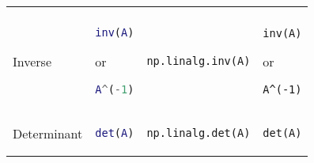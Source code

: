 \documentclass[10pt, landscape]{article}
\begin{document}
\begin{multicols}{2}
\begin{tabular}[]{@{}llll@{}}
\begin{minipage}[t]{0.20\columnwidth}
\end{minipage}\tabularnewline
\begin{minipage}[t]{0.23\columnwidth}\raggedright
Inverse
\end{minipage} & \begin{minipage}[t]{0.22\columnwidth}\raggedright
\begin{lstlisting}[language=Matlab]
inv(A)
\end{lstlisting}

or

\begin{lstlisting}[language=Matlab]
A^(-1)
\end{lstlisting}

\end{minipage} & \begin{minipage}[t]{0.23\columnwidth}\raggedright
\begin{lstlisting}[language=Python]
np.linalg.inv(A)
\end{lstlisting}

\end{minipage} & \begin{minipage}[t]{0.20\columnwidth}\raggedright
\begin{lstlisting}
inv(A)
\end{lstlisting}

or

\begin{lstlisting}
A^(-1)
\end{lstlisting}

\end{minipage}\tabularnewline
\begin{minipage}[t]{0.23\columnwidth}\raggedright
Determinant
\end{minipage} & \begin{minipage}[t]{0.22\columnwidth}\raggedright
\begin{lstlisting}[language=Matlab]
det(A)
\end{lstlisting}

\end{minipage} & \begin{minipage}[t]{0.23\columnwidth}\raggedright
\begin{lstlisting}[language=Python]
np.linalg.det(A)
\end{lstlisting}

\end{minipage} & \begin{minipage}[t]{0.20\columnwidth}\raggedright
\begin{lstlisting}
det(A)
\end{lstlisting}


\end{minipage}
\end{tabular}
\end{multicols}
\end{document}
